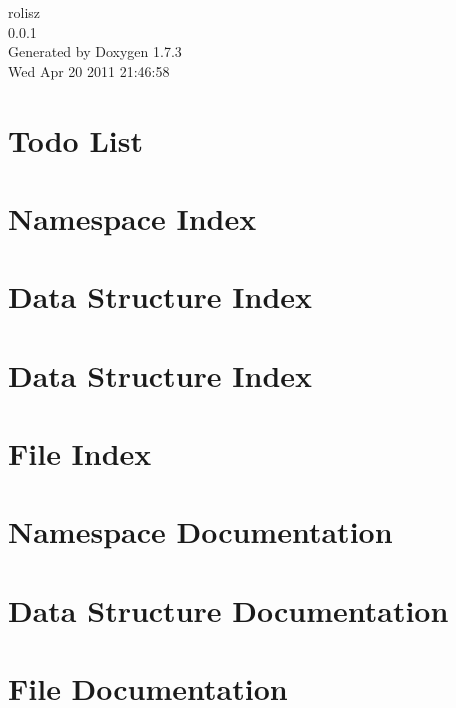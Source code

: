 \documentclass[a4paper]{book}
\begin{document}
\hypersetup{pageanchor=false}
\begin{titlepage}
\vspace*{7cm}
\begin{center}
{\Large rolisz \\[1ex]\large 0.0.1 }\\
\vspace*{1cm}
{\large Generated by Doxygen 1.7.3}\\
\vspace*{0.5cm}
{\small Wed Apr 20 2011 21:46:58}\\
\end{center}
\end{titlepage}
\clearemptydoublepage
{}
\tableofcontents
\clearemptydoublepage
{}
\hypersetup{pageanchor=true}
\chapter{Todo List}
\label{todo}
\hypertarget{todo}{}

\chapter{Namespace Index}

\chapter{Data Structure Index}

\chapter{Data Structure Index}

\chapter{File Index}

\chapter{Namespace Documentation}


\chapter{Data Structure Documentation}










\chapter{File Documentation}









\printindex
\end{document}
